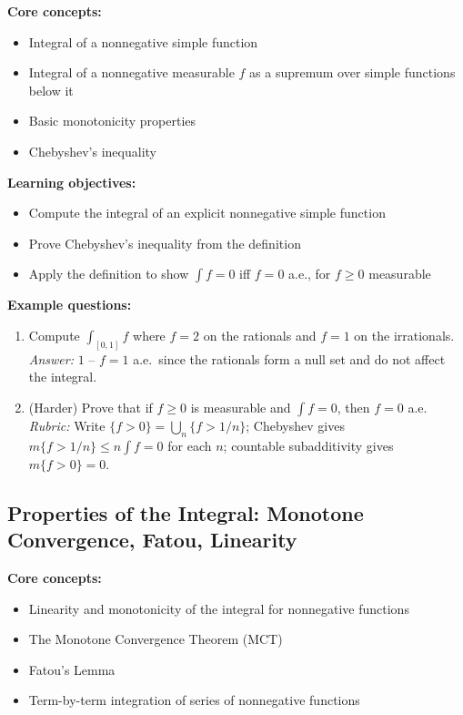 \documentclass[11pt]{article}
\begin{document}
\textbf{Core concepts:}
\begin{itemize}[nosep]
\item Integral of a nonnegative simple function
\item Integral of a nonnegative measurable $f$ as a supremum over simple functions below it
\item Basic monotonicity properties
\item Chebyshev's inequality
\end{itemize}

\textbf{Learning objectives:}
\begin{itemize}[nosep]
\item Compute the integral of an explicit nonnegative simple function
\item Prove Chebyshev's inequality from the definition
\item Apply the definition to show $\int f=0$ iff $f=0$ a.e., for $f\ge0$ measurable
\end{itemize}

\textbf{Example questions:}
\begin{enumerate}[nosep]
\item Compute $\int_{[0,1]}f$ where $f=2$ on the rationals and $f=1$ on the irrationals. \\
\textit{Answer:} $1$ -- $f=1$ a.e.\ since the rationals form a null set and do not affect the integral.
\item (Harder) Prove that if $f\ge0$ is measurable and $\int f=0$, then $f=0$ a.e. \\
\textit{Rubric:} Write $\{f>0\}=\bigcup_n\{f>1/n\}$; Chebyshev gives $m\{f>1/n\}\le n\int f=0$ for each $n$; countable subadditivity gives $m\{f>0\}=0$.
\end{enumerate}

\subsection{Properties of the Integral: Monotone Convergence, Fatou, Linearity}

\textbf{Core concepts:}
\begin{itemize}[nosep]
\item Linearity and monotonicity of the integral for nonnegative functions
\item The Monotone Convergence Theorem (MCT)
\item Fatou's Lemma
\item Term-by-term integration of series of nonnegative functions
\end{itemize}
\end{document}
